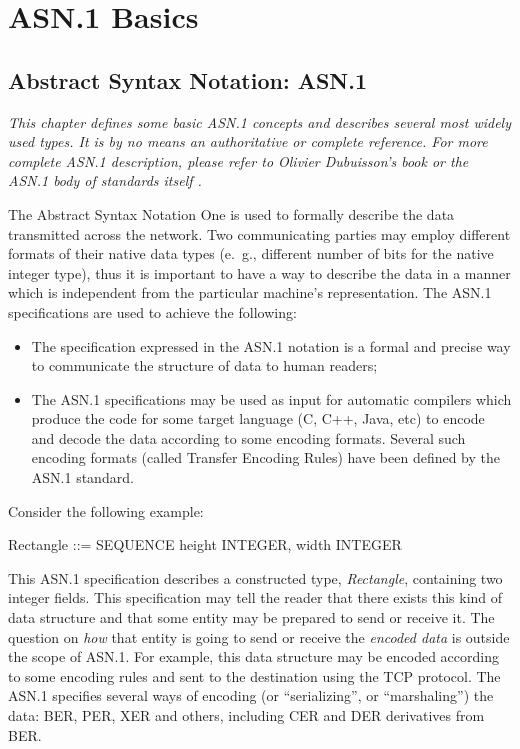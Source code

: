 \documentclass[english,oneside,12pt]{book}
\begin{document}
\part{\label{par:ASN.1-Basics}ASN.1 Basics}


\chapter{\label{cha:Abstract-Syntax-Notation:}Abstract Syntax Notation: ASN.1}

\emph{This chapter defines some basic ASN.1 concepts and describes
several most widely used types. It is by no means an authoritative
or complete reference. For more complete ASN.1 description, please
refer to Olivier Dubuisson's book \cite{Dub00} or the ASN.1 body
of standards itself \cite{ITU-T/ASN.1}.}

The Abstract Syntax Notation One is used to formally describe the
data transmitted across the network. Two communicating parties may employ
different formats of their native data types (e.~g., different number
of bits for the native integer type), thus it is important to have
a way to describe the data in a manner which is independent from the
particular machine's representation.
The ASN.1 specifications are used to achieve the following:
\begin{itemize}
\item The specification expressed in the ASN.1 notation is a formal and
precise way to communicate the structure of data to human readers;
\item The ASN.1 specifications may be used as input for automatic compilers
which produce the code for some target language (C, C++, Java, etc)
to encode and decode the data according to some encoding formats.
Several such encoding formats (called Transfer Encoding Rules)
have been defined by the ASN.1 standard.
\end{itemize}
Consider the following example:
\begin{asn}
Rectangle ::= SEQUENCE {
    height  INTEGER,
    width   INTEGER
}
\end{asn}
This ASN.1 specification describes a constructed type, \emph{Rectangle},
containing two integer fields. This specification may tell the reader
that there exists this kind of data structure and that some entity
may be prepared to send or receive it. The question on \emph{how}
that entity is going to send or receive the \emph{encoded data} is
outside the scope of ASN.1. For example, this data structure may be
encoded according to some encoding rules and sent to the destination
using the TCP protocol. The ASN.1 specifies several ways of encoding
(or ``serializing'', or ``marshaling'') the data: BER, PER, XER
and others, including CER and DER derivatives from BER.
\end{document}
